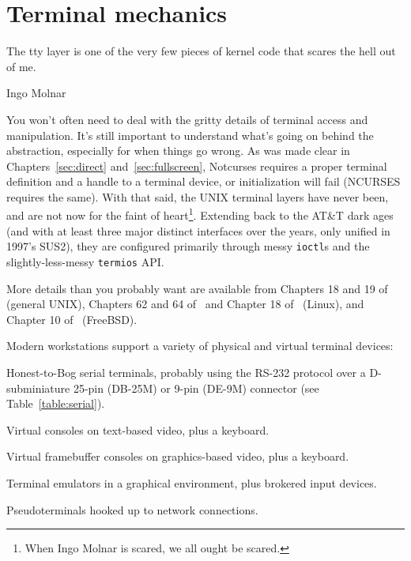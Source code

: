 \section{Terminal mechanics}
\label{section:tty}
\epigraph{The tty layer is one of the very few pieces of kernel code that scares the hell out of me.}{Ingo Molnar\cite{molnarhell}}
You won't often need to deal with the gritty details of terminal access and
manipulation. It's still important to understand what's going on behind the
abstraction, especially for when things go wrong. As was made clear in
Chapters~\ref{sec:direct} and~\ref{sec:fullscreen}, Notcurses requires a
proper terminal definition and a handle to a terminal device, or initialization
will fail (NCURSES requires the same). With that said, the UNIX terminal layers
have never been, and are not now for the faint of heart\footnote{When Ingo
Molnar is scared, we all ought be scared.}. Extending back to the AT\&T dark
ages (and with at least three major distinct interfaces over the years, only unified
in 1997's SUS2), they are configured primarily through messy \texttt{ioctl}s and the
slightly-less-messy \texttt{termios} API.

More details than you probably want are available from Chapters 18 and 19 of \cite{apiue}
(general UNIX), Chapters 62 and 64 of~\cite{linuxprogramming} and Chapter 18
of~\cite{linuxdevicedrivers} (Linux), and Chapter 10 of~\cite{freebsddesign} (FreeBSD).

Modern workstations support a variety of physical and virtual terminal devices:
\begin{denseitemize}
\item{Honest-to-Bog serial terminals, probably using the RS-232\cite{rs232}
      protocol over a D-subminiature 25-pin (DB-25M) or 9-pin (DE-9M)
      connector (see Table~\ref{table:serial}).}
\item{Virtual consoles on text-based video, plus a keyboard.}
\item{Virtual framebuffer consoles on graphics-based video, plus a keyboard.} 
\item{Terminal emulators in a graphical environment, plus brokered input devices.}
\item{Pseudoterminals hooked up to network connections.}
\end{denseitemize}

